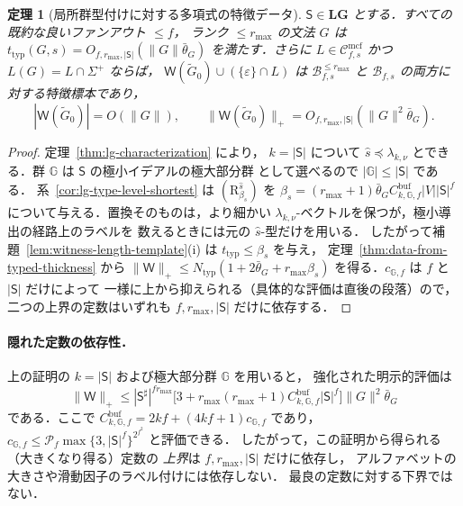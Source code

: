 \documentclass[11pt,a4paper]{ltjsarticle}
\numberwithin{equation}{section}
\theoremstyle{plain}
\newtheorem{theorem}{定理}[section]
\theoremstyle{definition}
\theoremstyle{remark}
\newcommand{\Wit}{\mathsf{W}}
\newcommand{\Cmcf}[2]{\mathcal{C}^{\mathrm{mcf}}_{#1,#2}}
\newcommand{\eps}{\varepsilon}
\theoremstyle{plain}
\begin{document}
\begin{theorem}[局所群型付けに対する多項式の特徴データ]
\label{thm:local-group-polydata}
$\mathsf S\in\mathbf{LG}$ とする．すべての既約な良いファンアウト $\le f$，
ランク $\le r_{\max}$ の文法 $G$ は
$t_{\mathrm{typ}}(G,s)=O_{f,r_{\max},|\mathsf S|}(\|G\|\bar\theta_G)$ を満たす．さらに
$L\in\Cmcf{f}{s}$ かつ $L(G)=L\cap\Sigma^+$ ならば，
$\Wit(\widetilde G_0)\cup(\{\eps\}\cap L)$ は
$\mathcal B^{\le r_{\max}}_{f,s}$ と $\mathcal B_{f,s}$ の両方に対する特徴標本であり，
\[
 |\Wit(\widetilde G_0)|=O(\|G\|),\qquad
 \|\Wit(\widetilde G_0)\|_+=O_{f,r_{\max},|\mathsf S|}(\|G\|^2\bar\theta_G).
\]
\end{theorem}

\begin{proof}
定理~\ref{thm:lg-characterization} により，
$k=|\mathsf S|$ について $\widehat s\preceq\lambda_{k,\nu}$
とできる．群 $\mathbb G$ は $\mathsf S$ の極小イデアルの極大部分群
として選べるので $|{\mathbb G}|\le|\mathsf S|$ である．
系~\ref{cor:lg-type-level-shortest} は
$(\mathrm R_{\beta_s}^{\widehat s})$ を
$\beta_s=(r_{\max}+1)\bar\theta_G
C^{\mathrm{buf}}_{k,{\mathbb G},f}|V||\mathsf S|^f$
について与える．置換そのものは，より細かい
$\lambda_{k,\nu}$-ベクトルを保つが，極小導出の経路上のラベルを
数えるときには元の $\widehat s$-型だけを用いる．
したがって補題~\ref{lem:witness-length-template}(i) は
$t_{\mathrm{typ}}\le\beta_s$ を与え，
定理~\ref{thm:data-from-typed-thickness} から
$\|\Wit\|_+\le N_{\mathrm{typ}}(1+2\bar\theta_G+r_{\max}\beta_s)$
を得る．$c_{{\mathbb G},f}$ は $f$ と $|\mathsf S|$ だけによって
一様に上から抑えられる（具体的な評価は直後の段落）ので，
二つの上界の定数はいずれも $f,r_{\max},|\mathsf S|$ だけに依存する．
\end{proof}

\paragraph{隠れた定数の依存性．}
上の証明の $k=|\mathsf S|$ および極大部分群 $\mathbb G$ を用いると，
強化された明示的評価は
\[
 \|\Wit\|_+\le|\mathsf S^\sharp|^{fr_{\max}}
 \bigl[3+r_{\max}(r_{\max}+1)
 C^{\mathrm{buf}}_{k,{\mathbb G},f}|\mathsf S|^f\bigr]
 \|G\|^2\bar\theta_G
\]
である．ここで
$C^{\mathrm{buf}}_{k,{\mathbb G},f}=2kf+(4kf+1)c_{{\mathbb G},f}$
であり，
$c_{{\mathbb G},f}\le\mathcal P_f
\max\{3,|\mathsf S|^f\}^{2^{f^2}}$ と評価できる．
したがって，この証明から得られる（大きくなり得る）定数の
\emph{上界}は $f,r_{\max},|\mathsf S|$ だけに依存し，
アルファベットの大きさや滑動因子のラベル付けには依存しない．
最良の定数に対する下界ではない．
\end{document}
